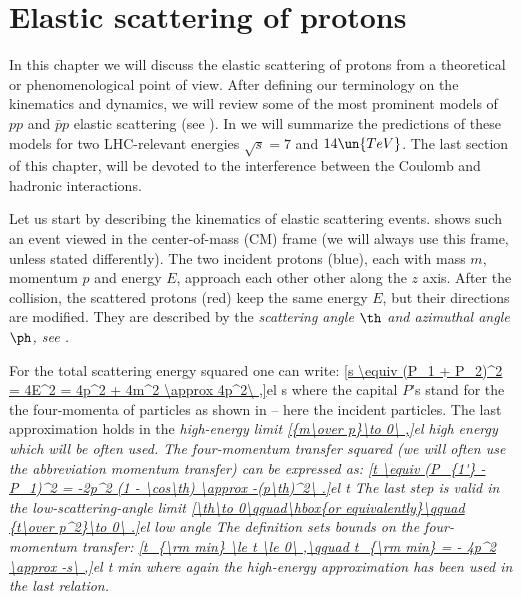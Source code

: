 \def\FC{F^{\rm C}}
\def\FH{F^{\rm H}}
\def\FCH{F^{\rm C+H}}

\def\KL{Kundr\' at-Lokaj\' i\v cek}
\def\KaL{Kundr\' at and Lokaj\' i\v cek}
\def\WY{West-Yennie}
\def\WaY{West and Yennie}


\iffalse
CM, QCD, QFT, LHC, BFKL, HP, LxG, RMS, QED, QM, OPE, TPE, IR, KL, CKL, WY, SWY
ATLAS ALFA, TDR
\fi

\chapter[el]{Elastic scattering of protons}

In this chapter we will discuss the elastic scattering of protons from a theoretical or phenomenological point of view. After defining our terminology on the kinematics and dynamics, we will review some of the most prominent models of $pp$ and $\bar pp$ elastic scattering (see ). In  we will summarize the predictions of these models for two LHC-relevant energies $\sqrt s = 7$ and $14\un{TeV}$. The last section of this chapter,  will be devoted to the interference between the Coulomb and hadronic interactions.

Let us start by describing the kinematics of elastic scattering events.  shows such an event viewed in the center-of-mass (CM) frame (we will always use this frame, unless stated differently). The two incident protons (blue), each with mass $m$, momentum $p$ and energy $E$, approach each other other along the $z$ axis. After the collision, the scattered protons (red) keep the same energy $E$, but their directions are modified. They are described by the \em{scattering angle} $\th$ and \em{azimuthal angle} $\ph$, see .


For the total scattering energy squared one can write:
\eqref{s \equiv (P_1 + P_2)^2 = 4E^2 = 4p^2 + 4m^2 \approx 4p^2\ ,}{el s}
where the capital $P$'s stand for the the four-momenta of particles as shown in  -- here the incident particles. The last approximation holds in the \em{high-energy} limit
\eqref{{m\over p}\to 0\ ,}{el high energy}
which will be often used. The four-momentum transfer squared (we will often use the abbreviation momentum transfer) can be expressed as:
\eqref{t \equiv (P_{1'} - P_1)^2 = -2p^2 (1 - \cos\th) \approx -(p\th)^2\ .}{el t}
The last step is valid in the \em{low-scattering-angle} limit
\eqref{\th\to 0\qquad\hbox{or equivalently}\qquad {t\over p^2}\to 0\ .}{el low angle}
The definition  sets bounds on the four-momentum transfer:
\eqref{t_{\rm min} \le t \le 0\ ,\qquad t_{\rm min} = - 4p^2 \approx -s\ ,}{el t min}
where again the high-energy approximation has been used in the last relation.

